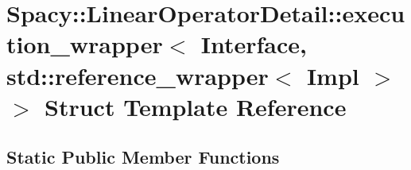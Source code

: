 \hypertarget{structSpacy_1_1LinearOperatorDetail_1_1execution__wrapper_3_01Interface_00_01std_1_1reference__wrapper_3_01Impl_01_4_01_4}{\section{\-Spacy\-:\-:\-Linear\-Operator\-Detail\-:\-:execution\-\_\-wrapper$<$ \-Interface, std\-:\-:reference\-\_\-wrapper$<$ \-Impl $>$ $>$ \-Struct \-Template \-Reference}
\label{structSpacy_1_1LinearOperatorDetail_1_1execution__wrapper_3_01Interface_00_01std_1_1reference__wrapper_3_01Impl_01_4_01_4}
}
\subsection*{\-Static \-Public \-Member \-Functions}
